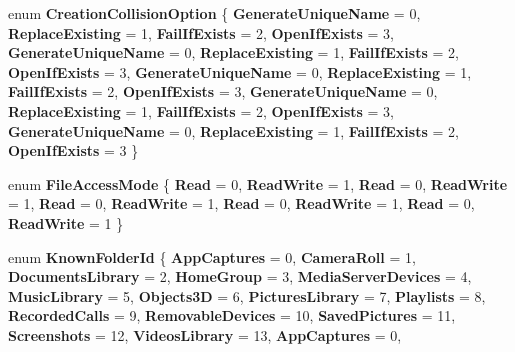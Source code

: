 \begin{DoxyCompactItemize}
enum {\bfseries Creation\+Collision\+Option} \{ \newline
{\bfseries Generate\+Unique\+Name} = 0, 
{\bfseries Replace\+Existing} = 1, 
{\bfseries Fail\+If\+Exists} = 2, 
{\bfseries Open\+If\+Exists} = 3, 
\newline
{\bfseries Generate\+Unique\+Name} = 0, 
{\bfseries Replace\+Existing} = 1, 
{\bfseries Fail\+If\+Exists} = 2, 
{\bfseries Open\+If\+Exists} = 3, 
\newline
{\bfseries Generate\+Unique\+Name} = 0, 
{\bfseries Replace\+Existing} = 1, 
{\bfseries Fail\+If\+Exists} = 2, 
{\bfseries Open\+If\+Exists} = 3, 
\newline
{\bfseries Generate\+Unique\+Name} = 0, 
{\bfseries Replace\+Existing} = 1, 
{\bfseries Fail\+If\+Exists} = 2, 
{\bfseries Open\+If\+Exists} = 3, 
\newline
{\bfseries Generate\+Unique\+Name} = 0, 
{\bfseries Replace\+Existing} = 1, 
{\bfseries Fail\+If\+Exists} = 2, 
{\bfseries Open\+If\+Exists} = 3
 \}
\item 
\mbox{\label{namespace_windows_1_1_storage_a5692c3d5d5dc5255f90f05e0a6c3ae9e}} 
enum {\bfseries File\+Access\+Mode} \{ \newline
{\bfseries Read} = 0, 
{\bfseries Read\+Write} = 1, 
{\bfseries Read} = 0, 
{\bfseries Read\+Write} = 1, 
\newline
{\bfseries Read} = 0, 
{\bfseries Read\+Write} = 1, 
{\bfseries Read} = 0, 
{\bfseries Read\+Write} = 1, 
\newline
{\bfseries Read} = 0, 
{\bfseries Read\+Write} = 1
 \}
\item 
\mbox{\label{namespace_windows_1_1_storage_ad806137f79e39155cbf64fd8e1e6de11}} 
enum {\bfseries Known\+Folder\+Id} \{ \newline
{\bfseries App\+Captures} = 0, 
{\bfseries Camera\+Roll} = 1, 
{\bfseries Documents\+Library} = 2, 
{\bfseries Home\+Group} = 3, 
\newline
{\bfseries Media\+Server\+Devices} = 4, 
{\bfseries Music\+Library} = 5, 
{\bfseries Objects3D} = 6, 
{\bfseries Pictures\+Library} = 7, 
\newline
{\bfseries Playlists} = 8, 
{\bfseries Recorded\+Calls} = 9, 
{\bfseries Removable\+Devices} = 10, 
{\bfseries Saved\+Pictures} = 11, 
\newline
{\bfseries Screenshots} = 12, 
{\bfseries Videos\+Library} = 13, 
{\bfseries App\+Captures} = 0, 

\end{DoxyCompactItemize}
